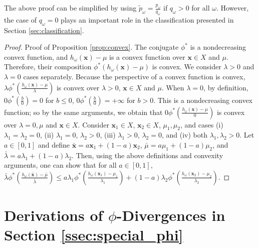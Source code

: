 \documentclass[opre,nonblindrev]{informs3} %
\newcommand{\x}{\mathbf{x}}
\begin{document}
\begin{APPENDICES}
\begin{remark}
	The above proof can be simplified by using $\tilde{p}_\omega = \frac{p_\omega}{q_\omega}$ if $q_\omega > 0$ for all $\omega$.
	However, the case of $q_\omega = 0$ plays an important role in the classification presented in Section \ref{sec:classification}.
\end{remark}




\begin{proof}{\sc Proof of Proposition \ref{prop:convex}.}
	The conjugate $\phi^*$ is a nondecreasing convex function, and $h_\omega(\x)-\mu$ is a convex function over $\x \in X$ and $\mu$. 
	Therefore, their composition  $\phi^*\left(h_\omega(\x)-\mu\right)$ is convex. 
	We consider $\lambda>0$ and $\lambda =0$ cases separately. 
	Because the perspective of a convex function is convex, $\lambda\phi^*\left(\frac{h_\omega(\x)-\mu}{\lambda}\right)$ is convex over $\lambda>0$,  $\x \in X$ and $\mu$. 
	When $\lambda = 0$, by definition, $0\phi^*\left(\frac{b}{0}\right)= 0$ for $b \leq 0$, $0\phi^*\left(\frac{b}{0}\right)= +\infty$ for $b>0$.  
	This is a nondecreasing convex function; so by the same arguments, we obtain that  $0\phi^*\left(\frac{h_\omega(\x)-\mu}{0}\right)$ is convex over $\lambda=0, \mu$ and $\x \in X$. 
	Consider $\x_1 \in X$, $\x_2 \in X$, $\mu_1,\mu_2$, and cases (i) $\lambda_1=\lambda_2 = 0$, (ii) $\lambda_1= 0$, $\lambda_2>0$, (iii) $\lambda_1 >0$, $\lambda_2 =0$, and (iv) both $\lambda_1, \lambda_2>0$.  
	Let $a \in [0,1]$ and define $\bar{\x}=a \x_1 + (1-a) \x_2$, $\bar{\mu}=a\mu_1 + (1-a)\mu_2$, and $\bar{\lambda}=a \lambda_1 + (1-a)\lambda_2$. 
	Then, using the above definitions and convexity arguments, one can show that for all $a \in [0,1]$, $\bar{\lambda} \phi^*\left(\frac{h_\omega(\bar{\x}) - \bar{\mu}}{\bar{\lambda}}\right) \leq a \lambda_1 \phi^*\left(\frac{h_\omega(\x_1) - \mu_1}{\lambda_1}\right) + (1-a) \lambda_2 \phi^*\left(\frac{h_\omega(\x_2) - \mu_2}{\lambda_2}\right)$.
	\Halmos
\end{proof}



	\section{Derivations of $\phi$-Divergences in Section \ref{ssec:special_phi}}


\end{APPENDICES}
\end{document}

